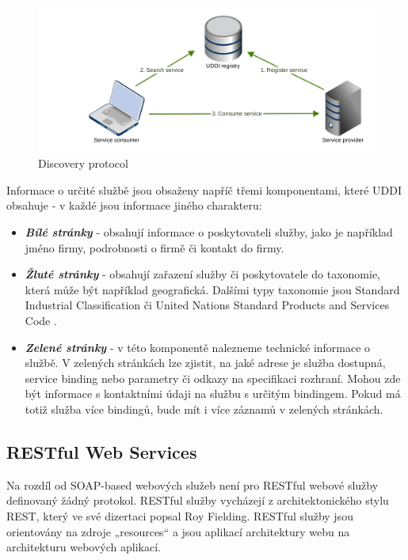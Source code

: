 \documentclass[11pt,twoside,a4paper]{book}
\begin{document}
\begin{figure}[h]
\begin{center}
\includegraphics[width=13cm]{images-pdf/uddi.pdf} 
\caption{Discovery protocol}
\label{fig:uddi}
\end{center}
\end{figure}

Informace o určité službě jsou obsaženy napříč třemi komponentami, které UDDI obsahuje -
v každé jsou informace jiného charakteru:

\begin{itemize}
  \item \textbf{\textit{Bílé stránky}} - obsahují informace o
  poskytovateli služby, jako je například jméno firmy, podrobnosti o firmě či kontakt do firmy.

  \item \textbf{\textit{Žluté stránky}} - obsahují zařazení služby
  či poskytovatele do taxonomie, která může být například geografická. Dalšími typy taxonomie jsou Standard Industrial
Classification  \cite{SIC} či United Nations Standard Products and Services
Code  \cite{UNSPSC}.

  \item \textbf{\textit{Zelené stránky}} - v této komponentě nalezneme technické
  informace o službě. V zelených stránkách lze zjistit, na jaké adrese je služba
  dostupná, service binding nebo
parametry či odkazy na specifikaci rozhraní. Mohou zde být informace s
kontaktními údaji na službu s určitým bindingem. Pokud má totiž služba více
bindingů, bude mít i více záznamů v zelených stránkách.

\end{itemize}

\subsection{RESTful Web Services}

Na rozdíl od SOAP-based webových služeb není pro RESTful webové služby
definovaný žádný protokol. RESTful služby vycházejí z architektonického stylu
REST, který ve své dizertaci \cite{Fielding00} popsal Roy Fielding. RESTful
služby jsou orientovány na zdroje „resources“ a jsou aplikací architektury webu
na architekturu webových aplikací.
\end{document}
